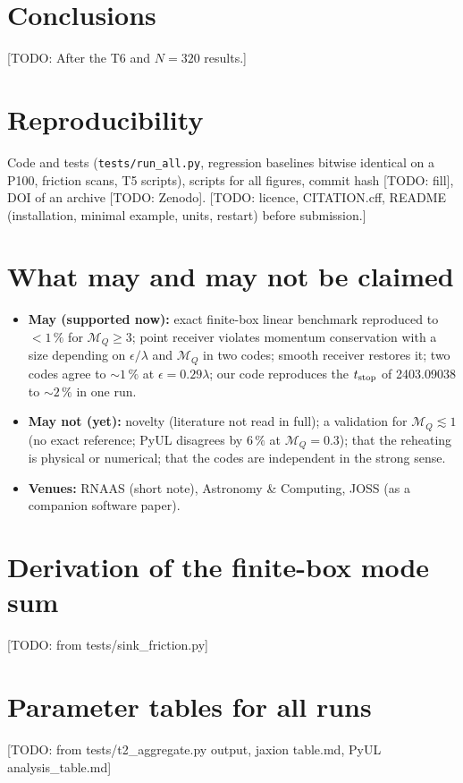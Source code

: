 \documentclass[11pt]{article}
\newcommand{\todo}[1]{{\color{red}[TODO: #1]}}
\newcommand{\MQ}{\mathcal{M}_Q}
\begin{document}
\section{Conclusions}
\todo{After the T6 and $N=320$ results.}

\section{Reproducibility}
Code and tests (\texttt{tests/run\_all.py}, regression baselines bitwise identical on a P100, friction scans, T5 scripts), scripts for all figures, commit hash \todo{fill}, DOI of an archive \todo{Zenodo}.
\todo{licence, CITATION.cff, README (installation, minimal example, units, restart) before submission.}

\section{What may and may not be claimed}\label{sec:claims}
\begin{itemize}
\item \textbf{May (supported now):} exact finite-box linear benchmark reproduced to $<1\,\%$ for $\MQ\ge3$; point receiver violates momentum conservation with a size depending on $\epsilon/\lambda$ and $\MQ$ in two codes; smooth receiver restores it;
two codes agree to $\sim1\,\%$ at $\epsilon=0.29\lambda$; our code reproduces the $t_{\rm stop}$ of 2403.09038 to $\sim2\,\%$ in one run.
\item \textbf{May not (yet):} novelty (literature not read in full); a validation for $\MQ\lesssim1$ (no exact reference; PyUL disagrees by $6\,\%$ at $\MQ=0.3$); that the reheating is physical or numerical; that the codes are independent in the strong sense.
\item \textbf{Venues:} RNAAS (short note), Astronomy \& Computing, JOSS (as a companion software paper).
\end{itemize}

\appendix
\section{Derivation of the finite-box mode sum} \todo{from tests/sink\_friction.py}
\section{Parameter tables for all runs} \todo{from tests/t2\_aggregate.py output, jaxion table.md, PyUL analysis\_table.md}
\end{document}
